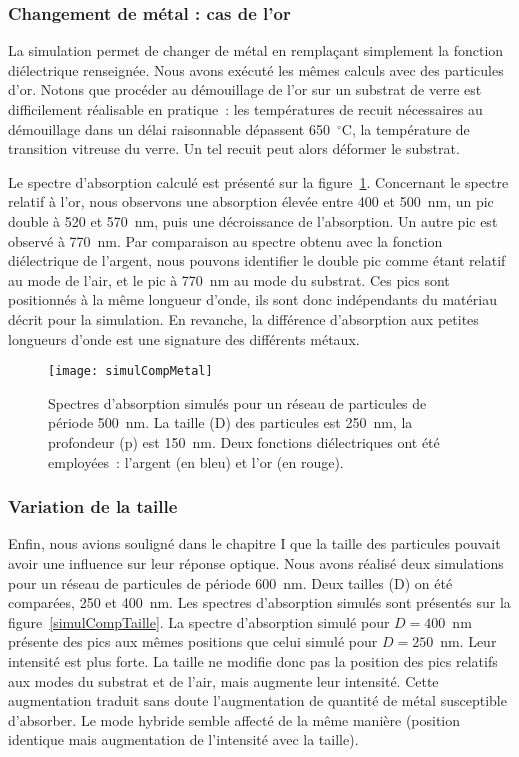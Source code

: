 	\subsubsection{Changement de métal : cas de l'or}
La simulation permet de changer de métal en remplaçant simplement la fonction diélectrique renseignée. Nous avons exécuté les mêmes calculs avec des particules d'or. Notons que procéder au démouillage de l'or sur un substrat de verre est difficilement réalisable en pratique~: les températures de recuit nécessaires au démouillage dans un délai raisonnable dépassent 650~$^\circ$C, la température de transition vitreuse du verre. Un tel recuit peut alors déformer le substrat.\par 
Le spectre d'absorption calculé est présenté sur la figure~\ref{simulCompMetal}. Concernant le spectre relatif à l'or, nous observons une absorption élevée entre 400 et 500~nm, un pic double à 520 et 570~nm, puis une décroissance de l'absorption. Un autre pic est observé à 770~nm. Par comparaison au spectre obtenu avec la fonction diélectrique de l'argent, nous pouvons identifier le double pic comme étant relatif au mode de l'air, et le pic à 770~nm au mode du substrat. Ces pics sont positionnés à la même longueur d'onde, ils sont donc indépendants du matériau décrit pour la simulation. En revanche, la différence d'absorption aux petites longueurs d'onde est une signature des différents métaux. \par  
\begin{figure}[!htb]
\centering
\texttt{[image: simulCompMetal]}
\caption{Spectres d'absorption simulés pour un réseau de particules de période 500~nm. La taille (D) des particules est 250~nm, la profondeur (p) est 150~nm. Deux fonctions diélectriques ont été employées~: l'argent (en bleu) et l'or (en rouge).}
\label{simulCompMetal}
\end{figure}

	\subsubsection{Variation de la taille}
Enfin, nous avions souligné dans le chapitre I que la taille des particules pouvait avoir une influence sur leur réponse optique. Nous avons réalisé deux simulations pour un réseau de particules de période 600~nm. Deux tailles (D) on été comparées, 250 et 400~nm. Les spectres d'absorption simulés sont présentés sur la figure~\ref{simulCompTaille}. La spectre d'absorption simulé pour $D = 400$~nm présente des pics aux mêmes positions que celui simulé pour $D = 250$~nm. Leur intensité est plus forte. La taille ne modifie donc pas la position des pics relatifs aux modes du substrat et de l'air, mais augmente leur intensité. Cette augmentation traduit sans doute l'augmentation de quantité de métal susceptible d'absorber. Le mode hybride semble affecté de la même manière (position identique mais augmentation de l'intensité avec la taille).\par 


